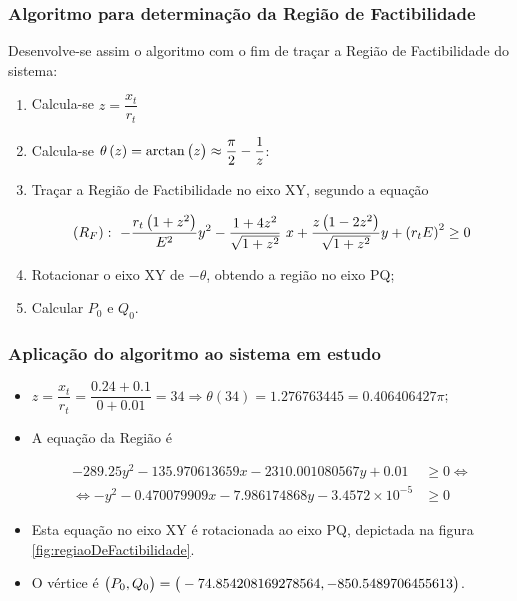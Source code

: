 \documentclass[10pt, compress,xcolor={svgnames,dvipsnames,x11names}]{beamer}
\begin{document}
\begin{frame}%
\frametitle{ Algoritmo para determinação da Região de Factibilidade }
\scriptsize

	Desenvolve-se assim o algoritmo com o fim de traçar a Região de Factibilidade do sistema:

\begin{enumerate}
	\item Calcula-se  $z = \dfrac{x_t}{r_t}$
%
	\item Calcula-se $\theta\left(z\right) = \arctan\left(\strut z\right) \approx \dfrac{\pi}{2} - \dfrac{1}{z}$:
%
	\item Traçar a Região de Factibilidade no eixo XY, segundo a equação

		\begin{align*}
			\left(R_F\right):\ -\dfrac{r_t\left(\strut 1 + z^2\right)}{E^2} y^2 - \dfrac{1 + 4z^2}{\sqrt{1 + z^2}}\ x + \dfrac{z\left(\strut 1 - 2z^2 \right)}{\sqrt{1 + z^2}}y + \left(r_tE\right)^2 \geq 0
		\end{align*}
%
	\item Rotacionar o eixo XY de $-\theta$, obtendo a região no eixo PQ;
%
	\item Calcular $P_0$ e $Q_0$.
\end{enumerate}

\normalsize
\end{frame}%

\begin{frame}%
\frametitle{ Aplicação do algoritmo ao sistema em estudo }
\scriptsize

\begin{itemize}
	\item $z = \dfrac{x_t}{r_t} = \dfrac{0.24 + 0.1}{0 + 0.01} = 34 \Rightarrow \theta\left(34\right) = 1.276763445 = 0.406406427\pi $;
	\item A equação da Região é

	\begin{align*}
		-289.25y^2 - 135.970613659x - 2310.001080567y + 0.01 &\geq 0 \Leftrightarrow \nonumber\\[2mm]
		\Leftrightarrow - y^2 - 0.470079909x - 7.986174868y - 3.4572\times 10^{-5}  &\geq 0
	\end{align*}
%
	\item Esta equação no eixo XY é rotacionada ao eixo PQ, depictada na figura \ref{fig:regiaoDeFactibilidade}.
%
	\item O vértice é $\left(\strut P_0,Q_0\right) = \left(\strut -74.854208169278564, -850.5489706455613\right)$.  
\end{itemize}

\normalsize
\end{frame}%
\end{document}
